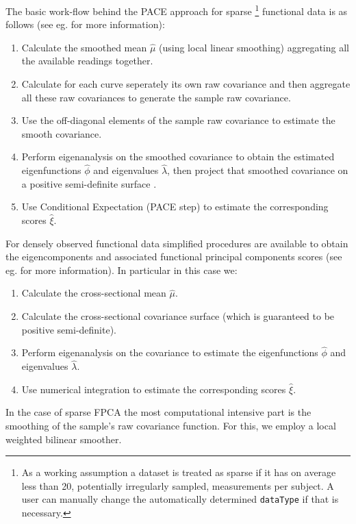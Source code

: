 \documentclass[11pt,english]{article}\usepackage[]{graphicx}\usepackage[]{color}
\begin{document}
The basic work-flow behind the PACE approach for sparse \footnote{As a working assumption a dataset is treated as sparse if it has on average less than 20, potentially irregularly sampled, measurements per subject. A user can manually change the automatically determined \texttt{dataType} if that is necessary.} functional data is as follows (see eg. \cite{Yao05, Liu09} for more information):
\begin{enumerate}
\item Calculate the smoothed mean $\hat{\mu}$ (using local linear smoothing) aggregating all the available readings together. 
\item Calculate for each curve seperately its own raw covariance and then aggregate all these raw covariances to generate the sample raw covariance.
\item Use the off-diagonal elements of the sample raw covariance to estimate the smooth covariance.
\item Perform eigenanalysis on the smoothed covariance to obtain the estimated eigenfunctions $\hat{\phi}$ and eigenvalues $\hat{\lambda}$, then project that smoothed covariance on a positive semi-definite surface \cite{Hall2008}.
\item Use Conditional Expectation (PACE step) to estimate the corresponding scores $\hat{\xi}$. 
\end{enumerate}
For densely observed functional data simplified procedures are available to obtain the eigencomponents and associated functional principal components scores (see eg. \cite{Castro86} for more information). In particular in this case we:
\begin{enumerate}
\item Calculate the cross-sectional mean $\hat{\mu}$.
\item Calculate the cross-sectional covariance surface (which is guaranteed to be positive semi-definite).
\item Perform eigenanalysis on the covariance to estimate the eigenfunctions $\hat{\phi}$ and eigenvalues $\hat{\lambda}$.
\item Use numerical integration to estimate the corresponding scores $\hat{\xi}$.
\end{enumerate}
In the case of sparse FPCA the most computational intensive part is the smoothing of the sample's raw covariance function. For this, we employ a local weighted bilinear smoother. 
\end{document}
